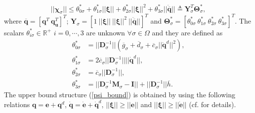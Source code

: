 \documentclass[AMA,STIX1COL,sort, compress]{WileyNJD-v2}
\begin{document}
\begin{equation}
|| \boldsymbol \chi_{\sigma}||\leq \theta_{0 \sigma}^{*} + \theta_{1 \sigma}^{*}  ||  \boldsymbol{ \xi} ||+ \theta_{2\sigma}^{*}  ||  \boldsymbol{ \xi} ||^2+ \theta_{3\sigma}^{*}  ||  \ddot{\overline{\mathbf{ q}}} ||\triangleq \mathbf{Y}_{\sigma}^T \boldsymbol \Theta_{\sigma}^{*} , \label{psi_bound} 
\end{equation}
where {\color{black}$\overline{\mathbf{q}}=[\mathbf{q}^T~\mathbf{q}_{\mathbf u}^T]^T$}; $\mathbf{Y}_{\sigma}=[1~||  \boldsymbol{ \xi} ||~ ||  \boldsymbol{ \xi} ||^2~||\ddot{\overline{\mathbf q}}||]^T $ and $\boldsymbol \Theta_{\sigma}^{*}=[\theta_{0\sigma}^{*} ~\theta_{1\sigma}^{*} ~\theta_{2\sigma}^{*}~ \theta_{3 \sigma}^{*}]^T$. The scalars $\theta_{i \sigma}^{*} \in \mathbb{R}^{+}$ $i=0,\cdots,3$ are unknown $\forall \sigma \in \Omega$ and they are defined as 
\begin{align*}
\theta_{0 \sigma}^{*} &= || \mathbf D_\sigma^{-1} || (\overline{g}_\sigma+\overline{d}_\sigma + \overline{c}_\sigma || \dot{\mathbf{q}}^d ||^2), \\
\theta_{1 \sigma}^{*} &= 2  \overline{c}_\sigma || \mathbf D_\sigma^{-1} |||| \dot{\mathbf{q}}^d ||,\\
\theta_{2 \sigma}^{*} &= \overline{c}_\sigma || \mathbf D_\sigma^{-1} ||,  \\
\theta_{3 \sigma}^{*} &= || \mathbf D_\sigma^{-1} \mathbf{M}_\sigma - \mathbf{I} || +  || \mathbf D_\sigma^{-1} || \overline{h}.
\end{align*}
The upper bound structure (\ref{psi_bound}) is obtained by using the following relations $\mathbf{q}=\mathbf{e}+\mathbf{q}^d$, $\dot{\mathbf{q}}=\dot{\mathbf{e}}+\dot{\mathbf{q}}^d$, $||\boldsymbol \xi || \geq || \mathbf{e} ||$ and $||\boldsymbol \xi || \geq || \dot{\mathbf{e}} ||$ (cf. \cite{roy2019adaptive,roy2020adaptive} for details). %
\end{document}
